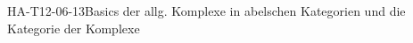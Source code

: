 
\begin{STUD}{HA-T12-06-13}{Basics der allg. Komplexe in abelschen Kategorien und die Kategorie der Komplexe}
\end{STUD}
